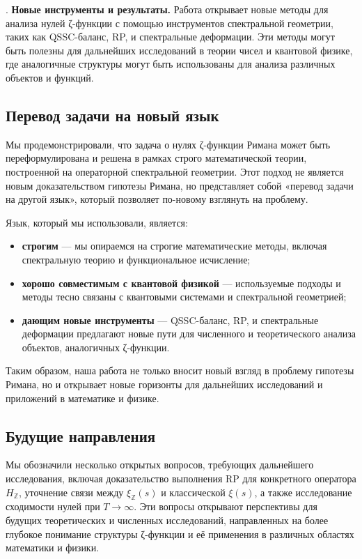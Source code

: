 \documentclass{article}
\numberwithin{equation}{section}
\theoremstyle{plain}
\theoremstyle{definition}
\theoremstyle{remark}
\def\infty{∞}\def\partial{∂}\def\sum{Σ}\def\int{∫}%
\begin{document}
. \textbf{Новые инструменты и результаты.} Работа открывает новые методы для анализа нулей ζ-функции с помощью инструментов спектральной геометрии, таких как QSSC-баланс, RP, и спектральные деформации. Эти методы могут быть полезны для дальнейших исследований в теории чисел и квантовой физике, где аналогичные структуры могут быть использованы для анализа различных объектов и функций.

\subsection{Перевод задачи на новый язык}
\noindent
Мы продемонстрировали, что задача о нулях ζ-функции Римана может быть переформулирована и решена в рамках строго математической теории, построенной на операторной спектральной геометрии. Этот подход не является новым доказательством гипотезы Римана, но представляет собой «перевод задачи на другой язык», который позволяет по-новому взглянуть на проблему.

\noindent
Язык, который мы использовали, является:
\begin{itemize}
    \item \textbf{строгим} — мы опираемся на строгие математические методы, включая спектральную теорию и функциональное исчисление;
    \item \textbf{хорошо совместимым с квантовой физикой} — используемые подходы и методы тесно связаны с квантовыми системами и спектральной геометрией;
    \item \textbf{дающим новые инструменты} — QSSC-баланс, RP, и спектральные деформации предлагают новые пути для численного и теоретического анализа объектов, аналогичных ζ-функции.
\end{itemize}

\noindent
Таким образом, наша работа не только вносит новый взгляд в проблему гипотезы Римана, но и открывает новые горизонты для дальнейших исследований и приложений в математике и физике.

\subsection{Будущие направления}
\noindent
Мы обозначили несколько открытых вопросов, требующих дальнейшего исследования, включая доказательство выполнения RP для конкретного оператора \( H_{\mathbb{Z}} \), уточнение связи между \( \xi_{\mathbb{Z}}(s) \) и классической \( \xi(s) \), а также исследование сходимости нулей при \( T \to \infty \). Эти вопросы открывают перспективы для будущих теоретических и численных исследований, направленных на более глубокое понимание структуры ζ-функции и её применения в различных областях математики и физики.
\clearpage
\end{document}
